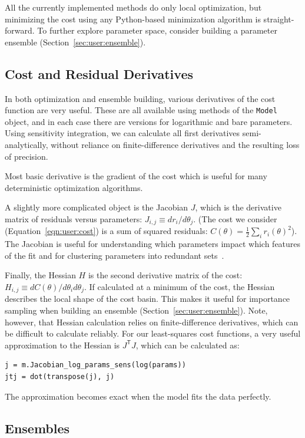 \documentclass[12pt]{article}
\makeatletter
\newcommand{\transpose}[1]{\ensuremath{{#1}^\mathsf{T}}}
\newcommand{\JtJ}{\ensuremath{\transpose{J}\!J}\xspace}
\newcommand{\py}[1]{\lstinline[language=Python, showstringspaces=False]@#1@}
\makeatother
\begin{document}
All the currently implemented methods do only local optimization, but minimizing the cost using any Python-based minimization algorithm is straight-forward.
To further explore parameter space, consider building a parameter ensemble (Section~\ref{sec:user:ensemble}).

\subsection{Cost and Residual Derivatives}

In both optimization and ensemble building, various derivatives of the cost function are very useful.
These are all available using methods of the \py{Model} object, and in each case there are versions for logarithmic and bare parameters.
Using sensitivity integration, we can calculate all first derivatives semi-analytically, without reliance on finite-difference derivatives and the resulting loss of precision.

Most basic derivative is the gradient of the cost which is useful for many deterministic optimization algorithms.

A slightly more complicated object is the Jacobian $J$, which is the derivative matrix of residuals versus parameters: $J_{i,j} \equiv d r_i/d \theta_j$. (The cost we consider (Equation~\ref{eqn:user:cost}) is a sum of squared residuals: $C(\theta) = \frac{1}{2} \sum_i r_i(\theta)^2$).
The Jacobian is useful for understanding which parameters impact which features of the fit and for clustering parameters into redundant sets~\cite{bib:WaterfallPhD}.

Finally, the Hessian $H$ is the second derivative matrix of the cost: $H_{i,j} \equiv d C(\theta)/d \theta_i d\theta_j$.
If calculated at a minimum of the cost, the Hessian describes the local shape of the cost basin.
This makes it useful for importance sampling when building an ensemble (Section~\ref{sec:user:ensemble}).
Note, however, that Hessian calculation relies on finite-difference derivatives, which can be difficult to calculate reliably.
For our least-squares cost functions, a very useful approximation to the Hessian is \JtJ, which can be calculated as:
\begin{lstlisting}
j = m.Jacobian_log_params_sens(log(params))
jtj = dot(transpose(j), j)   
\end{lstlisting}
The approximation becomes exact when the model fits the data perfectly.

\subsection{Ensembles\label{sec:user:ensemble}}
\end{document}
